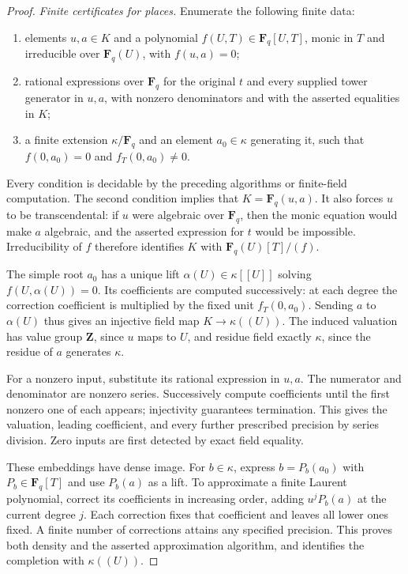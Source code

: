 \begin{proof}
\emph{Finite certificates for places.}
Enumerate the following finite data:
\begin{enumerate}
\item elements $u,a\in K$ and a polynomial
$f(U,T)\in\mathbf F_q[U,T]$, monic in $T$ and irreducible
over $\mathbf F_q(U)$, with $f(u,a)=0$;
\item rational expressions over $\mathbf F_q$ for the original
$t$ and every supplied tower generator in $u,a$, with
nonzero denominators and with the asserted equalities in $K$;
\item a finite extension $\kappa/\mathbf F_q$ and an element
$a_0\in\kappa$ generating it, such that
$f(0,a_0)=0$ and $f_T(0,a_0)\ne0$.
\end{enumerate}
Every condition is decidable by the preceding algorithms or
finite-field computation. The second condition implies that
$K=\mathbf F_q(u,a)$. It also forces $u$ to be transcendental:
if $u$ were algebraic over $\mathbf F_q$, then the monic
equation would make $a$ algebraic, and the asserted expression
for $t$ would be impossible. Irreducibility of $f$ therefore
identifies $K$ with $\mathbf F_q(U)[T]/(f)$.

The simple root $a_0$ has a unique lift
$\alpha(U)\in\kappa[[U]]$ solving $f(U,\alpha(U))=0$.
Its coefficients are computed successively: at each degree
the correction coefficient is multiplied by the fixed unit
$f_T(0,a_0)$. Sending $a$ to $\alpha(U)$ thus gives an
injective field map $K\to\kappa((U))$.
The induced valuation has value group $\mathbf Z$, since
$u$ maps to $U$, and residue field exactly $\kappa$, since
the residue of $a$ generates $\kappa$.

For a nonzero input, substitute its rational expression in
$u,a$. The numerator and denominator are nonzero series.
Successively compute coefficients until the first nonzero
one of each appears; injectivity guarantees termination.
This gives the valuation, leading coefficient, and every
further prescribed precision by series division.
Zero inputs are first detected by exact field equality.

These embeddings have dense image. For $b\in\kappa$, express
$b=P_b(a_0)$ with $P_b\in\mathbf F_q[T]$ and use $P_b(a)$
as a lift. To approximate a finite Laurent polynomial,
correct its coefficients in increasing order, adding
$u^jP_b(a)$ at the current degree $j$. Each correction fixes
that coefficient and leaves all lower ones fixed. A finite
number of corrections attains any specified precision.
This proves both density and the asserted approximation
algorithm, and identifies the completion with
$\kappa((U))$.


\end{proof}
